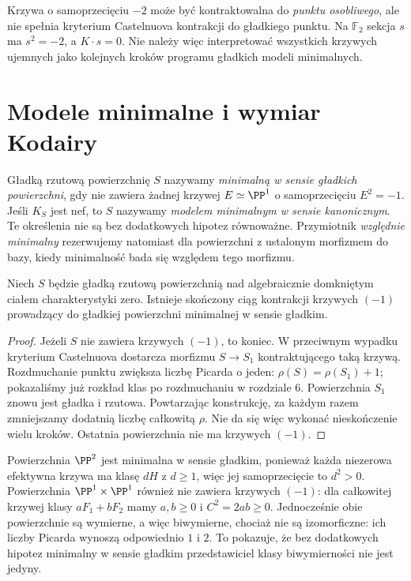 \begin{uwaga}
Krzywa o samoprzecięciu $-2$ może być kontraktowalna
do \emph{punktu osobliwego}, ale nie spełnia kryterium
Castelnuova kontrakcji do gładkiego punktu.
Na $\mathbb F_2$ sekcja $s$ ma $s^2=-2$,
a $K\cdot s=0$. Nie należy więc interpretować
wszystkich krzywych ujemnych jako kolejnych kroków
programu gładkich modeli minimalnych.
\end{uwaga}

\section{Modele minimalne i wymiar Kodairy}
\label{sec:ga8-kodaira-minimal}

\begin{definicja}
\label{def:ga8-minimal}
Gładką rzutową powierzchnię $S$ nazywamy
\emph{minimalną w sensie gładkich powierzchni},
gdy nie zawiera żadnej krzywej $E\simeq\PP^1$
o samoprzecięciu $E^2=-1$. Jeśli $K_S$ jest nef,
to $S$ nazywamy \emph{modelem minimalnym w sensie
kanonicznym}. Te określenia nie są bez dodatkowych
hipotez równoważne. Przymiotnik \emph{względnie minimalny}
rezerwujemy natomiast dla powierzchni z ustalonym morfizmem
do bazy, kiedy minimalność bada się względem tego morfizmu.
\end{definicja}

\begin{stwierdzenie}
\label{st:ga8-terminate-minusone}
Niech $S$ będzie gładką rzutową powierzchnią nad
algebraicznie domkniętym ciałem charakterystyki zero.
Istnieje skończony ciąg kontrakcji krzywych $(-1)$
prowadzący do gładkiej powierzchni minimalnej w sensie gładkim.
\end{stwierdzenie}
\begin{proof}
Jeżeli $S$ nie zawiera krzywych $(-1)$, to koniec.
W przeciwnym wypadku kryterium Castelnuova dostarcza
morfizmu $S\to S_1$ kontraktującego taką krzywą.
Rozdmuchanie punktu zwiększa liczbę Picarda o jeden:
$\rho(S)=\rho(S_1)+1$; pokazaliśmy już rozkład
klas po rozdmuchaniu w rozdziale 6. Powierzchnia
$S_1$ znowu jest gładka i rzutowa. Powtarzając
konstrukcję, za każdym razem zmniejszamy dodatnią
liczbę całkowitą $\rho$. Nie da się więc wykonać
nieskończenie wielu kroków. Ostatnia powierzchnia
nie ma krzywych $(-1)$.
\end{proof}

\begin{przyklad}
Powierzchnia $\PP^2$ jest minimalna w sensie gładkim,
ponieważ każda niezerowa efektywna krzywa ma
klasę $dH$ z $d\ge1$, więc jej samoprzecięcie
to $d^2>0$. Powierzchnia
$\PP^1\times\PP^1$ również nie zawiera krzywych
$(-1)$: dla całkowitej krzywej klasy $aF_1+bF_2$
mamy $a,b\ge0$ i $C^2=2ab\ge0$.
Jednocześnie obie powierzchnie są wymierne, a więc
biwymierne, chociaż nie są izomorficzne:
ich liczby Picarda wynoszą odpowiednio $1$ i $2$.
To pokazuje, że bez dodatkowych hipotez
minimalny w sensie gładkim przedstawiciel klasy
biwymierności nie jest jedyny.
\end{przyklad}

